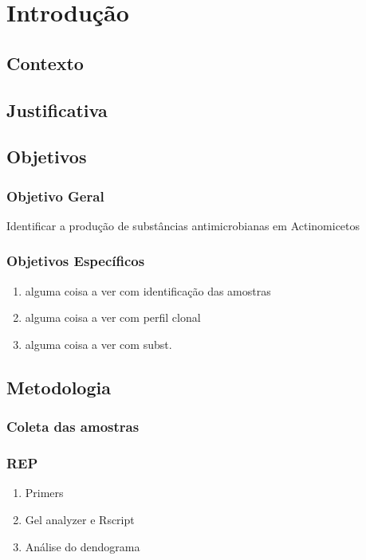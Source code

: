 \chapter{Introdução}
\label{cap:introducao}

\section{Contexto}



\section{Justificativa}


\section{Objetivos}

\subsection{Objetivo Geral}

Identificar a produção de substâncias antimicrobianas em Actinomicetos

\subsection{Objetivos Específicos}
\begin{enumerate}
    \item alguma coisa a ver com identificação das amostras %
    \item alguma coisa a ver com perfil clonal %
    \item alguma coisa a ver com subst. %
\end{enumerate}

\section{Metodologia}
\subsection{Coleta das amostras}
\subsection{REP}
\begin{enumerate}
    \item Primers%
    \item Gel analyzer e Rscript%
    \item Análise do dendograma%
\end{enumerate}

